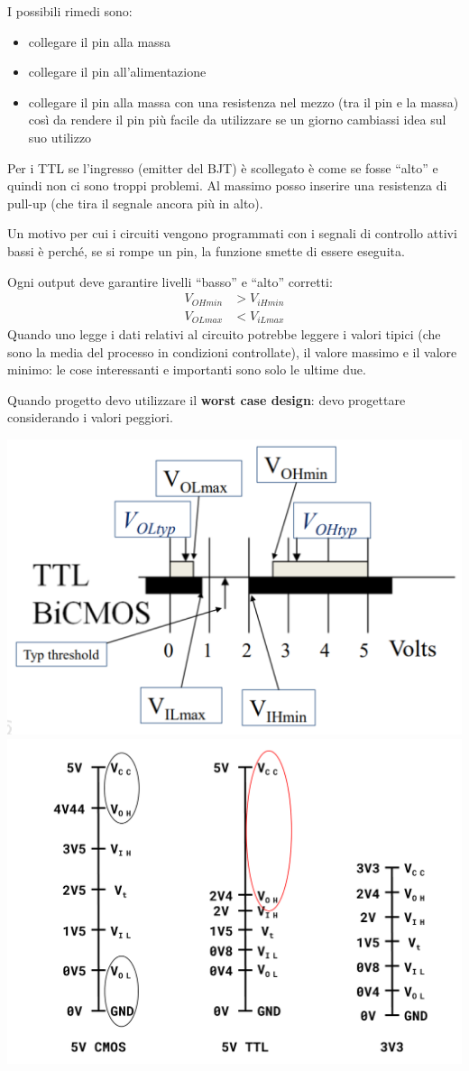 \documentclass[
]{book}
\providecommand{\tightlist}{%
  \setlength{\itemsep}{0pt}\setlength{\parskip}{0pt}}
\begin{document}
I possibili rimedi sono:

\begin{itemize}
\tightlist
\item
  collegare il pin alla massa
\item
  collegare il pin all'alimentazione
\item
  collegare il pin alla massa con una resistenza nel mezzo (tra il pin e
  la massa) così da rendere il pin più facile da utilizzare se un giorno
  cambiassi idea sul suo utilizzo
\end{itemize}

Per i TTL se l'ingresso (emitter del BJT) è scollegato è come se fosse
``alto'' e quindi non ci sono troppi problemi. Al massimo posso inserire
una resistenza di pull-up (che tira il segnale ancora più in alto).

Un motivo per cui i circuiti vengono programmati con i segnali di
controllo attivi bassi è perché, se si rompe un pin, la funzione smette
di essere eseguita.

Ogni output deve garantire livelli ``basso'' e ``alto'' corretti:
\begin{align*}
V_{OHmin}&>V_{iHmin}\\V_{OLmax}&<V_{iLmax}
\end{align*} Quando uno legge i dati relativi al circuito potrebbe
leggere i valori tipici (che sono la media del processo in condizioni
controllate), il valore massimo e il valore minimo: le cose interessanti
e importanti sono solo le ultime due.

Quando progetto devo utilizzare il \textbf{worst case design}: devo
progettare considerando i valori peggiori.

\label{fig:figureRef2}
\includegraphics[width=0.35\linewidth,height=\textheight,keepaspectratio]{immagini/35.png}
\includegraphics[width=0.35\linewidth,height=\textheight,keepaspectratio]{immagini/36.png}
\end{document}
